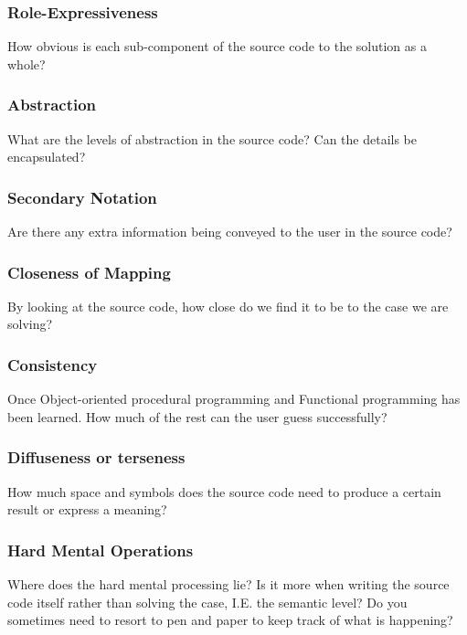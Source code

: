 \documentclass[12pt]{article}
\theoremstyle{definition}
\theoremstyle{theorem}
\begin{document}
\subsubsection{Role-Expressiveness}

How obvious is each sub-component of the source code to the solution as a whole?

\subsubsection{Abstraction}

What are the levels of abstraction in the source code? Can the details be
encapsulated?

\subsubsection{Secondary Notation}

Are there any extra information being conveyed to the user in the source code?

\subsubsection{Closeness of Mapping}

By looking at the source code, how close do we find it to be to the case
we are solving?

\subsubsection{Consistency}

Once Object-oriented procedural programming and Functional programming has been
learned. How much of the rest can the user guess successfully? 

\subsubsection{Diffuseness or terseness}

How much space and symbols does the source code need to produce a certain result
or express a meaning?

\subsubsection{Hard Mental Operations}

Where does the hard mental processing lie? Is it more when writing the source
code itself rather than solving the case, I.E. the semantic level? Do you
sometimes need to resort to pen and paper to keep track of what is happening?
\end{document}
